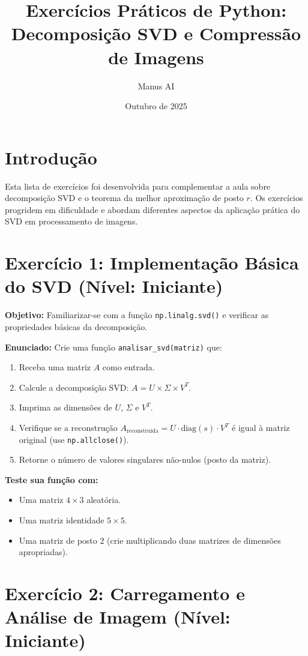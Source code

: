 \documentclass[a4paper,12pt]{article}
\title{Exercícios Práticos de Python: Decomposição SVD e Compressão de Imagens}
\author{Manus AI}
\date{Outubro de 2025}
\begin{document}
\maketitle

\section*{Introdução}
Esta lista de exercícios foi desenvolvida para complementar a aula sobre decomposição SVD e o teorema da melhor aproximação de posto $r$. Os exercícios progridem em dificuldade e abordam diferentes aspectos da aplicação prática do SVD em processamento de imagens.

\section*{Exercício 1: Implementação Básica do SVD (Nível: Iniciante)}

\textbf{Objetivo:} Familiarizar-se com a função \texttt{np.linalg.svd()} e verificar as propriedades básicas da decomposição.

\textbf{Enunciado:}
Crie uma função \texttt{analisar\_svd(matriz)} que:
\begin{enumerate}
    \item Receba uma matriz $A$ como entrada.
    \item Calcule a decomposição SVD: $A = U \times \Sigma \times V^T$.
    \item Imprima as dimensões de $U$, $\Sigma$ e $V^T$.
    \item Verifique se a reconstrução $A_{\text{reconstruída}} = U \cdot \text{diag}(s) \cdot V^T$ é igual à matriz original (use \texttt{np.allclose()}).
    \item Retorne o número de valores singulares não-nulos (posto da matriz).
\end{enumerate}

\textbf{Teste sua função com:}
\begin{itemize}
    \item Uma matriz $4 \times 3$ aleatória.
    \item Uma matriz identidade $5 \times 5$.
    \item Uma matriz de posto 2 (crie multiplicando duas matrizes de dimensões apropriadas).
\end{itemize}

\section*{Exercício 2: Carregamento e Análise de Imagem (Nível: Iniciante)}
\end{document}
